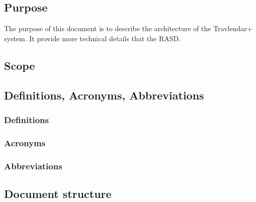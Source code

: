\subsection{Purpose}
The purpose of this document is to describe the architecture of the Travlendar+ system.
It provide more technical details that the RASD.

\subsection{Scope}


\subsection{Definitions, Acronyms, Abbreviations}
\subsubsection{Definitions}
\subsubsection{Acronyms}
\subsubsection{Abbreviations}
\subsection{Document structure}